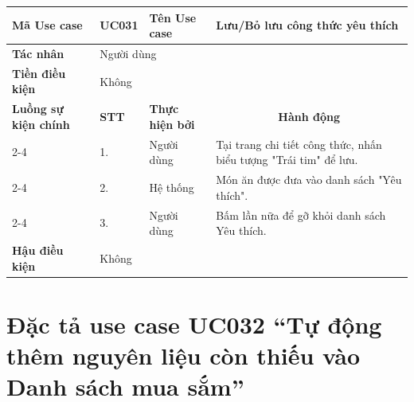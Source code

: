 \begin{longtable}{|p{2.7cm}|p{0.8cm}|p{2.6cm}|p{7.3cm}|}
\hline
\cellcolor[HTML]{D5F5E3}\textbf{Mã Use case} & \multicolumn{1}{l|}{UC031} & \cellcolor[HTML]{D5F5E3}\textbf{Tên Use case} & Lưu/Bỏ lưu công thức yêu thích \\ \hline
\cellcolor[HTML]{D5F5E3}\textbf{Tác nhân} & \multicolumn{3}{p{10.7cm}|}{Người dùng} \\ \hline
\cellcolor[HTML]{D5F5E3}\textbf{Tiền điều kiện} & \multicolumn{3}{p{10.7cm}|}{Không} \\ \hline

\cellcolor[HTML]{D5F5E3}\textbf{Luồng sự kiện chính} & \cellcolor[HTML]{FDEBD0}\textbf{STT} & \cellcolor[HTML]{FDEBD0}\textbf{Thực hiện bởi} & \multicolumn{1}{c|}{\cellcolor[HTML]{FDEBD0}\textbf{Hành động}} \\ \cline{2-4} 
\cellcolor[HTML]{D5F5E3} & 1. & Người dùng & Tại trang chi tiết công thức, nhấn biểu tượng "Trái tim" để lưu. \\ \cline{2-4} 
\cellcolor[HTML]{D5F5E3} & 2. & Hệ thống & Món ăn được đưa vào danh sách "Yêu thích". \\ \cline{2-4} 
\cellcolor[HTML]{D5F5E3} & 3. & Người dùng & Bấm lần nữa để gỡ khỏi danh sách Yêu thích. \\ \hline

\cellcolor[HTML]{D5F5E3}\textbf{Hậu điều kiện} & \multicolumn{3}{p{10.7cm}|}{Không} \\ \hline
\end{longtable}
\endgroup

\section{Đặc tả use case UC032 ``Tự động thêm nguyên liệu còn thiếu vào Danh sách mua sắm''}
\vspace{0.5cm}

\begingroup
\renewcommand{\arraystretch}{1.5}

